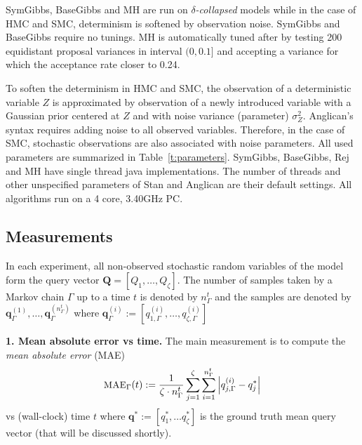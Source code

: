 \documentclass[]{article}
\newcommand{\bvec}[1]{\textbf{#1}}
\begin{document}
SymGibbs, BaseGibbs and MH are run on \emph{$\delta$-collapsed} models while in the case of HMC and SMC, determinism is softened by observation noise. %
SymGibbs and BaseGibbs require no tunings. 
MH is automatically tuned after \citep{roberts1997weak} by testing 200 equidistant proposal variances in interval 
$(0, 0.1]$ and accepting a variance for which the acceptance rate closer to 0.24.

To soften the determinism in HMC and SMC,
the observation of a deterministic variable $Z$ %
is approximated by observation of a newly introduced variable 
with a Gaussian prior centered at $Z$ and with noise variance (parameter) $\sigma^2_{Z}$. 
Anglican's syntax requires %
adding noise to all observed variables. Therefore, in the case of SMC, stochastic observations are also associated with noise parameters.
All used parameters are summarized in Table~\ref{t:parameters}. 
SymGibbs, BaseGibbs, Rej and MH have single thread java implementations.
The number of threads and other unspecified parameters of Stan and Anglican are their default settings.   
All algorithms run on a 4 core, 3.40GHz PC.%

\subsection{Measurements}
\label{sect:experimental.results.measures}
In each experiment, all non-observed stochastic random variables of the model  form the query vector $\bvec{Q} = [Q_1, \ldots, Q_\zeta]$.
The number of samples taken by a Markov chain $\Gamma$ up to a time $t$ is denoted by $n_{\Gamma}^t$ and  
the samples are denoted by 
$\bvec{q}_\Gamma^{(1)}, \ldots, \bvec{q}^{(n_{\Gamma}^t)}_\Gamma$
where $\bvec{q}_\Gamma^{(i)} := 
[q_{1, \Gamma}^{(i)} , \ldots, q_{\zeta, \Gamma}^{(i)}]$

{\bf 1. Mean absolute error vs time.}
The main measurement 
is to compute the \emph{mean absolute error} (MAE) 
\vspace{-1mm}
\begin{equation}\footnotesize
\label{e:error.vs.time.measure}
\textsc{MAE}_{\Gamma}(t) := \frac{1}{\zeta \cdot n_\Gamma^t} 
\sum_{j=1}^{\zeta}
\sum_{i=1}^{n_\Gamma^t}
\left|{q}^{(i)}_{j, \Gamma} - {q}_j^* \right|
\end{equation}
\vspace{0mm}
vs (wall-clock) time $t$ where 
$\bvec{q}^* := [q_1^*, \ldots q_\zeta^*]$ 
is the ground truth mean query vector (that will be discussed shortly).
\end{document}
